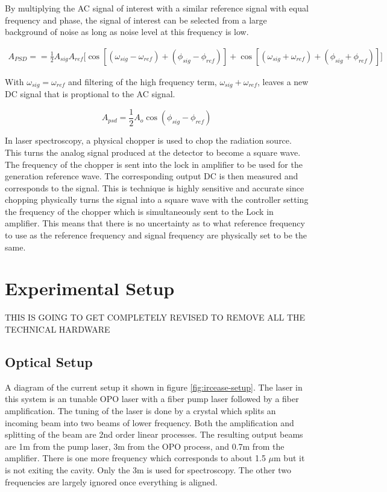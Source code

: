 \documentclass[11pt,a4paper]{book}
\begin{document}
		By multiplying the AC signal of interest with a similar reference signal with equal frequency and phase, the signal of interest can be selected from a large background of noise as long as noise level at this frequency is low. 
		
		\begin{equation}
			\begin{split}
			A_{PSD} =
			= \frac{1}{2} A_{sig} A_{ref}\big[\cos{[(\omega_{sig}-\omega_{ref})+(\phi_{sig}-\phi_{ref})]} 
			+ \cos{[(\omega_{sig}+\omega_{ref})+(\phi_{sig}+\phi_{ref})]}\big] 
			\end{split}
			\label{eq:PSDsignal}
		\end{equation}
		
		With $\omega_{sig}=\omega_{ref}$ and filtering of the high frequency term, $\omega_{sig}+\omega_{ref}$, leaves a new DC signal that is proptional to the AC signal. \cite{LIA}
		
		\begin{equation}
			A_{psd}=\frac{1}{2} A_{o} \cos(\phi_{sig}-\phi_{ref})
			\label{eq:PSDDC}
		\end{equation}
		
		In laser spectroscopy, a physical chopper is used to chop the radiation source. This turns the analog signal produced at the detector to become a square wave. The frequency of the chopper is sent into the lock in amplifier to be used for the generation reference wave. The corresponding output DC is then measured and corresponds to the signal. This is technique is highly sensitive and accurate since chopping physically turns the signal into a square wave with the controller setting the frequency of the chopper which is simultaneously sent to the Lock in amplifier. This means that there is no uncertainty as to what reference frequency to use as the reference frequency and signal frequency are physically set to be the same.
		

\chapter{Experimental Setup}
	THIS IS GOING TO GET COMPLETELY REVISED TO REMOVE ALL THE TECHNICAL HARDWARE
	\section{Optical Setup}
		A diagram of the current setup it shown in figure \autoref{fig:ircease-setup}.
		The laser in this system is an tunable OPO laser with a fiber pump laser followed by a fiber amplification. The tuning of the laser is done by a crystal which splits an incoming beam into two beams of lower frequency. Both the amplification and splitting  of the beam are 2nd order linear processes. 
		The resulting output beams are 1\text{$\mu$}m from the pump laser, 3\text{$\mu$}m from the OPO process, and 0.7\text{$\mu$}m from the amplifier. There is one more frequency which corresponds to about 1.5 $\mu$m but it is not exiting the cavity. Only the 3\text{$\mu$}m  is used for spectroscopy. The other two frequencies are largely ignored once everything is aligned. 
		
\end{document}
